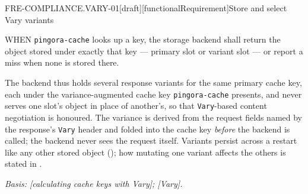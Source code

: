 \begin{requirement}{FRE-COMPLIANCE.VARY-01}[draft][functionalRequirement]{Store and select Vary variants}


  WHEN \texttt{pingora-cache} looks up a key, the storage backend shall return
  the object stored under exactly that key --- primary slot or variant slot
  --- or report a miss when none is stored there.

  The backend thus holds several response variants for the same primary cache
  key, each under the variance-augmented cache key \texttt{pingora-cache}
  presents, and never serves one slot's object in place of another's, so that
  \texttt{Vary}-based content negotiation is honoured. The variance is derived
  from the request fields named by the response's \texttt{Vary} header and
  folded into the cache key \emph{before} the backend is called; the backend
  never sees the request itself. Variants persist across a restart like any
  other stored object (); how mutating one
  variant affects the others is stated in
  .

  \textit{Basis: [calculating cache keys with Vary];
  [Vary].}



\end{requirement}

